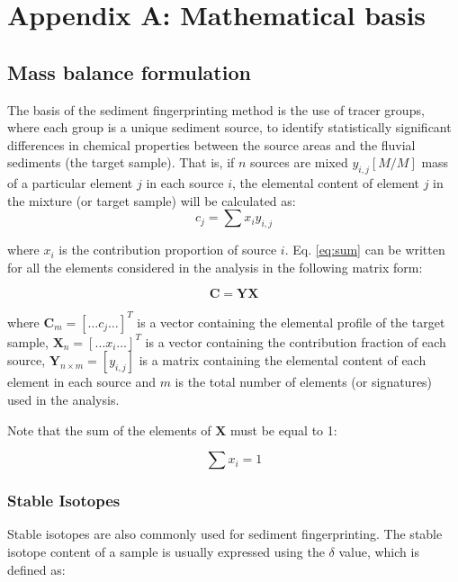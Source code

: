 \chapter{Appendix A: Mathematical basis}\label{sec:basic_concepts}

\section{Mass balance formulation}

The basis of the sediment fingerprinting method is the use of tracer groups, where each group is a unique sediment source,  to identify statistically significant differences in chemical properties between the source areas and the fluvial sediments (the target sample).   That is, if $n$ sources are mixed $y_{i,j}[M/M]$ mass of a particular element $j$ in each source $i$, the elemental content of element $j$ in the mixture (or target sample) will be calculated as:
\begin{equation}\label{eq:sum}
    c_j = \sum x_i y_{i,j}
\end{equation}

where $x_i$ is the contribution proportion of source $i$. Eq. \eqref{eq:sum} can be written for all the elements considered in the analysis in the following matrix form:

\begin{equation}
    \mathbf{C} = \mathbf{Y}\mathbf{X}
\end{equation}\label{eq:mass_balance_matrix}

where $\mathbf{C}_{m}=[\dots c_j \dots]^T$ is a vector containing the elemental profile of the target sample, $\mathbf{X}_{n}=[\dots x_i \dots]^T$ is a vector containing the contribution fraction of each source, $\mathbf{Y}_{n\times m}=[y_{i,j}]$ is a matrix containing the elemental content of each element in each source and $m$ is the total number of elements (or signatures) used in the analysis. 

Note that the sum of the elements of $\mathbf{X}$ must be equal to 1:

\begin{equation}
    \sum x_i = 1
\end{equation}

\subsection{Stable Isotopes}
Stable isotopes are also commonly used for sediment fingerprinting. The stable isotope content of a sample is usually expressed using the $\delta$ value, which is defined as: 

